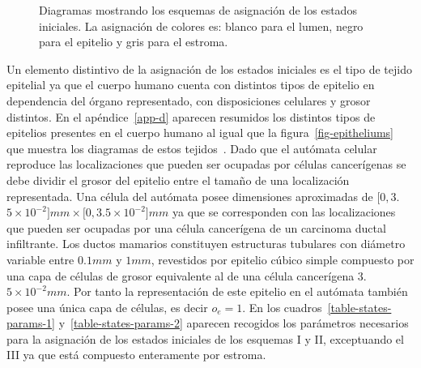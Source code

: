 \begin{figure}[!ht]
\begin{center}
\end{center}\vspace*{-0.75cm}
\caption[Diagramas mostrando los esquemas de asignaci\'on de los estados iniciales]{Diagramas mostrando los esquemas de asignaci\'on de los estados iniciales. La asignaci\'on de colores es: blanco para el lumen, negro para el epitelio y gris para el estroma. }
\label{fig-initial-states-diagrams}
\end{figure}

Un elemento distintivo de la asignaci\'on de los estados iniciales es el tipo de tejido epitelial ya que el cuerpo humano cuenta con distintos tipos de epitelio en dependencia del \'organo representado, con disposiciones celulares y grosor distintos. En el ap\'endice~\ref{app-d} aparecen resumidos los distintos tipos de epitelios presentes en el cuerpo humano al igual que la figura~\ref{fig-epitheliums} que muestra los diagramas de estos tejidos~\cite{robins}. Dado que el aut\'omata celular reproduce las localizaciones que pueden ser ocupadas por c\'elulas cancer\'igenas se debe dividir el grosor del epitelio entre el tama\~no de una localizaci\'on representada. Una c\'elula del aut\'omata posee dimensiones aproximadas de $[0,3$.$5 \times 10^{-2}]mm \times [0,3$.$5 \times 10^{-2}]mm$ ya que se corresponden con las localizaciones que pueden ser ocupadas por una c\'elula cancer\'igena de un carcinoma ductal infiltrante. Los ductos mamarios constituyen estructuras tubulares con di\'ametro variable entre $0$.$1mm$ y $1mm$, revestidos por epitelio c\'ubico simple compuesto por una capa de c\'elulas de grosor equivalente al de una c\'elula cancer\'igena $3$.$5 \times 10^{-2}mm$. Por tanto la representaci\'on de este epitelio en el aut\'omata tambi\'en posee una \'unica capa de c\'elulas, es decir $o_e=1$. En los cuadros~\ref{table-states-params-1} y~\ref{table-states-params-2} aparecen recogidos los par\'ametros necesarios para la asignaci\'on de los estados iniciales de los esquemas I y II, exceptuando el III ya que est\'a compuesto enteramente por estroma.

